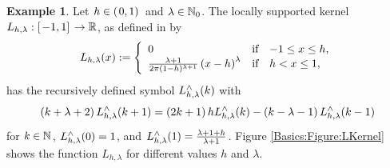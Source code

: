 \documentclass[11pt,a4paper,twoside,bibtotoc]{scrartcl}
\theoremstyle{plain}
\theoremstyle{definition}
\newtheorem{example}[theorem]{Example}
\theoremstyle{remark}
\numberwithin{equation}{section}
\numberwithin{table}{section}
\numberwithin{figure}{section}
\begin{document}
\begin{example}
  Let $h \in \left(\left.0,1\right)\right.$ and $\lambda \in \mathbb{N}_{0}$.
  The locally supported kernel $L_{h,\lambda}: \left[\left.-1,1\right]\right.\rightarrow
  \mathbb{R}$, as defined in \cite{Sc97} by
  \[
  \fun{L_{h,\lambda}}{x} := 
  \left\{\begin{array}{l@{\quad \text{if} \quad}l} 
      0 & -1 \le x \le h, \\
      \frac{\lambda+1}{2\pi(1-h)^{\lambda+1}}\paren{x-h}^{\lambda} &  h   < x \le 1,
    \end{array}\right.
  \]
  has the recursively defined symbol $L_{h,\lambda}^{\wedge}{\hspace{-0.4ex}}\left(k\right)$ with
  \[
  \left(k+\lambda+2\right) L_{h,\lambda}^{\wedge}{\hspace{-0.4ex}}\left(k+1\right) = \left(2k+1\right) h
  L_{h,\lambda}^{\wedge}{\hspace{-0.4ex}}\left(k\right) - \left(k-\lambda-1\right)
  L_{h,\lambda}^{\wedge}{\hspace{-0.4ex}}\left(k-1\right)
  \]
  for $k\in \mathbb{N}$, $L_{h,\lambda}^{\wedge}{\hspace{-0.4ex}}\left(0\right) = 1$, and
  $L_{h,\lambda}^{\wedge}{\hspace{-0.4ex}}\left(1\right) = \frac{\lambda + 1 + h}{\lambda+1}$.
  Figure \ref{Basics:Figure:LKernel} shows the function $L_{h,\lambda}$ for
  different values $h$ and $\lambda$.
  \begin{figure}[tb]
    \centering
    \hfill
    \\
    \hfill

\end{figure}
\end{example}
\end{document}
